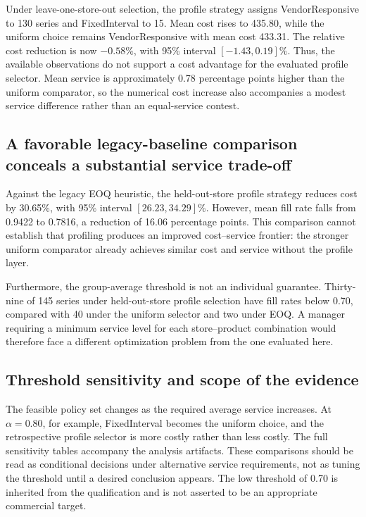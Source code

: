 \documentclass[preprint,12pt]{elsarticle}
\begin{document}
Under leave-one-store-out selection, the profile strategy assigns VendorResponsive to 130 series and FixedInterval to 15. Mean cost rises to 435.80, while the uniform choice remains VendorResponsive with mean cost 433.31. The relative cost reduction is now $-0.58\%$, with 95\% interval $[-1.43,0.19]\%$. Thus, the available observations do not support a cost advantage for the evaluated profile selector. Mean service is approximately 0.78 percentage points higher than the uniform comparator, so the numerical cost increase also accompanies a modest service difference rather than an equal-service contest.

\subsection{A favorable legacy-baseline comparison conceals a substantial service trade-off}
Against the legacy EOQ heuristic, the held-out-store profile strategy reduces cost by 30.65\%, with 95\% interval $[26.23,34.29]\%$. However, mean fill rate falls from 0.9422 to 0.7816, a reduction of 16.06 percentage points. This comparison cannot establish that profiling produces an improved cost--service frontier: the stronger uniform comparator already achieves similar cost and service without the profile layer.

Furthermore, the group-average threshold is not an individual guarantee. Thirty-nine of 145 series under held-out-store profile selection have fill rates below 0.70, compared with 40 under the uniform selector and two under EOQ. A manager requiring a minimum service level for each store--product combination would therefore face a different optimization problem from the one evaluated here.

\subsection{Threshold sensitivity and scope of the evidence}
The feasible policy set changes as the required average service increases. At $\alpha=0.80$, for example, FixedInterval becomes the uniform choice, and the retrospective profile selector is more costly rather than less costly. The full sensitivity tables accompany the analysis artifacts. These comparisons should be read as conditional decisions under alternative service requirements, not as tuning the threshold until a desired conclusion appears. The low threshold of 0.70 is inherited from the qualification and is not asserted to be an appropriate commercial target.
\end{document}
